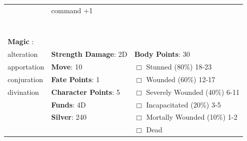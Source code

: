 \documentclass[10pt]{article}
\begin{document}
\begin{table}
\begin{tabular}{m{156pt} m{156pt} m{156pt}}
 \hrulefill & command           +1 \hrulefill &  \hrulefill \\

 \hrulefill &  \hrulefill &  \hrulefill \\

 \hrulefill &  \hrulefill &  \hrulefill \\

 \hrulefill &  \hrulefill &  \hrulefill \\

 \hrulefill &  \hrulefill &  \hrulefill \\

 \hrulefill &  \hrulefill &  \hrulefill \\

 \hrulefill &  \hrulefill &  \hrulefill \\

                                  &                                 &                             \\
\textbf{Magic }:  \hrulefill  &                                 &                             \\
alteration           \hrulefill & \textbf{Strength Damage}: 2D \hrulefill                             & \textbf{Body Points}: 30 \hrulefill \\
apportation          \hrulefill                        & \textbf{Move}:             10             \hrulefill    & $\Box$ Stunned \footnotesize{(80\%)} \hfill 18-23 \\
conjuration          \hrulefill                        & \textbf{Fate Points}:      1      \hrulefill    & $\Box$ Wounded \footnotesize{(60\%)} \hfill 12-17 \\
divination           \hrulefill                        & \textbf{Character Points}: 5 \hrulefill    & $\Box$ Severely Wounded \footnotesize{(40\%)} \hfill 6-11 \\
 \hrulefill                        & \textbf{Funds}:            4D            \hrulefill    & $\Box$ Incapacitated \footnotesize{(20\%)} \hfill 3-5 \\
 \hrulefill                        & \textbf{Silver}:           240           \hrulefill    & $\Box$ Mortally Wounded \footnotesize{(10\%)} \hfill 1-2 \\
 \hrulefill                        &  \hrulefill                                                       & $\Box$ Dead   \\
\end{tabular}
\end{table}
\cleardoublepage
\end{document}
